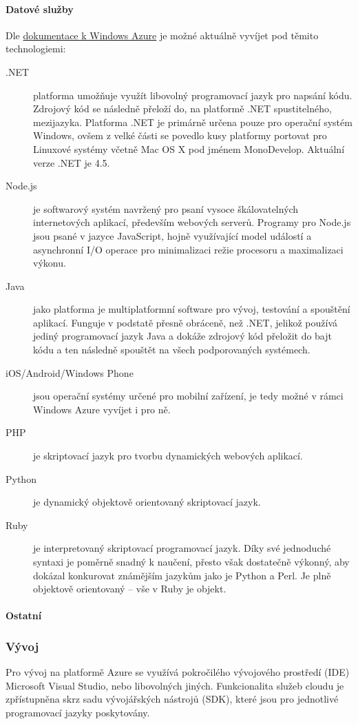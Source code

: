 \paragraph{Datové služby}
Dle \href{http://www.windowsazure.com/en-us/documentation/}{dokumentace k Windows Azure}\cite{azure:dokumentace} je možné aktuálně vyvíjet pod těmito technologiemi:
\begin{description}
	\item [.NET] platforma umožňuje využít libovolný programovací jazyk pro napsání kódu. Zdrojový kód se následně přeloží do, na platformě .NET spustitelného, mezijazyka. Platforma .NET je primárně určena pouze pro operační systém Windows, ovšem z velké části se povedlo kusy platformy portovat pro Linuxové systémy včetně Mac OS X pod jménem MonoDevelop. Aktuální verze .NET je 4.5.
	\item [Node.js] je softwarový systém navržený pro psaní vysoce škálovatelných internetových aplikací, především webových serverů. Programy pro Node.js jsou psané v jazyce JavaScript, hojně využívající model událostí a asynchronní I/O operace pro minimalizaci režie procesoru a maximalizaci výkonu.\cite{wiki:node.js}
	\item [Java] jako platforma je multiplatformní software pro vývoj, testování a spouštění aplikací. Funguje v podstatě přesně obráceně, než .NET, jelikož používá jediný programovací jazyk Java a dokáže zdrojový kód přeložit do bajt kódu a ten následně spouštět na všech podporovaných systémech.
	\item [iOS/Android/Windows Phone] jsou operační systémy určené pro mobilní zařízení, je tedy možné v rámci Windows Azure vyvíjet i pro ně.
	\item [PHP] je skriptovací jazyk pro tvorbu dynamických webových aplikací.
	\item [Python] je dynamický objektově orientovaný skriptovací jazyk.
	\item [Ruby] je interpretovaný skriptovací programovací jazyk. Díky své jednoduché syntaxi je poměrně snadný k naučení, přesto však dostatečně výkonný, aby dokázal konkurovat známějším jazykům jako je Python a Perl. Je plně objektově orientovaný – vše v Ruby je objekt.\cite{wiki:ruby}
\end{description}

\paragraph{Ostatní}

\subsubsection{Vývoj}
Pro vývoj na platformě Azure se využívá pokročilého vývojového prostředí (IDE) Microsoft Visual Studio, nebo libovolných jiných. Funkcionalita služeb cloudu je zpřístupněna skrz sadu vývojářských nástrojů (SDK), které jsou pro jednotlivé programovací jazyky poskytovány. 


